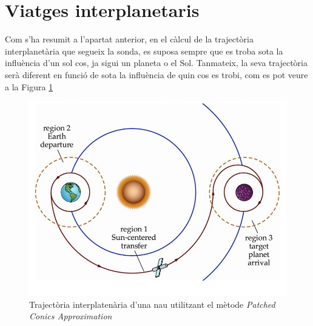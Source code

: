 \section{Viatges interplanetaris}
Com s'ha resumit a l'apartat anterior, en el càlcul de la trajectòria interplanetària que segueix la sonda, es suposa sempre que es troba sota la influència d'un sol cos, ja sigui un planeta o el Sol. Tanmateix, la seva trajectòria serà diferent en funció de sota la influència de quin cos es trobi, com es pot veure a la Figura \ref{patchedconics}

\begin{figure}[H]
	\centering
	\includegraphics[scale=0.5]{./plots/patchedconics}
	\caption{Trajectòria interplatenària d'una nau utilitzant el mètode \textit{Patched Conics Approximation}}
	\label{patchedconics}
\end{figure}

